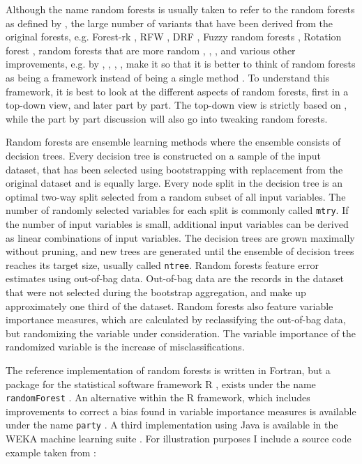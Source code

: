 \documentclass[a4paper,man,12pt,apacite,floatsintext,draftfirst]{apa6} %
\begin{document}
Although the name random forests is usually taken to refer to the random
forests as defined by \cite{breiman2001random}, the large number of
variants that have been derived from the original forests, e.g.
Forest-rk \cite{bernard2008forest}, RFW \cite{maudes2012random},
DRF \cite{bernard2012dynamic}, Fuzzy random forests \cite{bonissone2008fuzzy},
Rotation forest \cite{rodriguez2006rotation}, random forests that are
more random \cite{geurts2006extremely}, \cite{liu2005maximizing},
\cite{cutler2001pert}, and various other improvements, e.g. by
\cite{banfield2007comparison}, \cite{robnik2004improving},
\cite{strobl2009introduction}, \cite{zhang2012bias}, make it so that it
is better to think of random forests as being a framework instead of being
a single method \cite{wpRF}.
To understand this framework, it is best to look at the different aspects
of random forests, first in a top-down view, and later part by part.
The top-down view is strictly based on \cite{breiman2001random},
while the part by part discussion will also go into tweaking random forests.

Random forests are ensemble learning methods where the ensemble consists
of decision trees.
Every decision tree is constructed on a sample of the input dataset,
that has been selected using bootstrapping with replacement from the original
dataset and is equally large.
Every node split in the decision tree is an optimal two-way split selected
from a random subset of all input variables.
The number of randomly selected variables for each split is commonly called
\texttt{mtry}.
If the number of input variables is small, additional input variables can be
derived as linear combinations of input variables.
The decision trees are grown maximally without pruning,
and new trees are generated until the ensemble of decision trees reaches its
target size, usually called \texttt{ntree}.
Random forests feature error estimates using out-of-bag data.
Out-of-bag data are the records in the dataset that were not selected during
the bootstrap aggregation, and make up approximately one third of the dataset.
Random forests also feature variable importance measures,
which are calculated by reclassifying the out-of-bag data,
but randomizing the variable under consideration.
The variable importance of the randomized variable is the increase of
misclassifications.

The reference implementation of random forests is written in Fortran,
but a package for the statistical software framework R \cite{rproject2012},
exists under the name \texttt{randomForest} \cite{liaw2002classification}.
An alternative within the R framework, which includes improvements
to correct a bias found in variable
importance measures is available under the name \texttt{party}
\cite{strobl2008conditional}.
A third implementation using Java is available in the WEKA machine learning
suite \cite{hall2009weka}.
For illustration purposes I include a source code example taken from
\cite{strobl2008conditional}:
\end{document}
